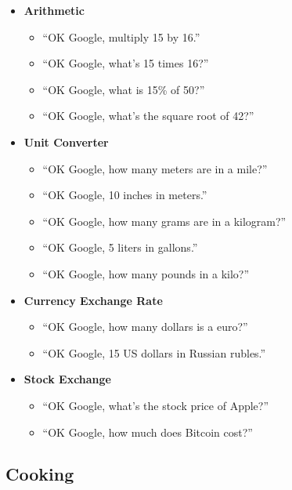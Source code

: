 \documentclass[
  jou,
  floatsintext,
  longtable,
  a4paper,
  nolmodern,
  notxfonts,
  notimes,
  colorlinks=true,linkcolor=blue,citecolor=blue,urlcolor=blue]{apa7}
\providecommand{\tightlist}{%
  \setlength{\itemsep}{0pt}\setlength{\parskip}{0pt}}
\begin{document}
\begin{itemize}
\tightlist
\item
  \textbf{Arithmetic}

  \begin{itemize}
  \tightlist
  \item
    ``OK Google, multiply 15 by 16.''
  \item
    ``OK Google, what's 15 times 16?''
  \item
    ``OK Google, what is 15\% of 50?''
  \item
    ``OK Google, what's the square root of 42?''
  \end{itemize}
\item
  \textbf{Unit Converter}

  \begin{itemize}
  \tightlist
  \item
    ``OK Google, how many meters are in a mile?''
  \item
    ``OK Google, 10 inches in meters.''
  \item
    ``OK Google, how many grams are in a kilogram?''
  \item
    ``OK Google, 5 liters in gallons.''
  \item
    ``OK Google, how many pounds in a kilo?''
  \end{itemize}
\item
  \textbf{Currency Exchange Rate}

  \begin{itemize}
  \tightlist
  \item
    ``OK Google, how many dollars is a euro?''
  \item
    ``OK Google, 15 US dollars in Russian rubles.''
  \end{itemize}
\item
  \textbf{Stock Exchange}

  \begin{itemize}
  \tightlist
  \item
    ``OK Google, what's the stock price of Apple?''
  \item
    ``OK Google, how much does Bitcoin cost?''
  \end{itemize}
\end{itemize}

\subsection{Cooking}\label{cooking}
\end{document}

